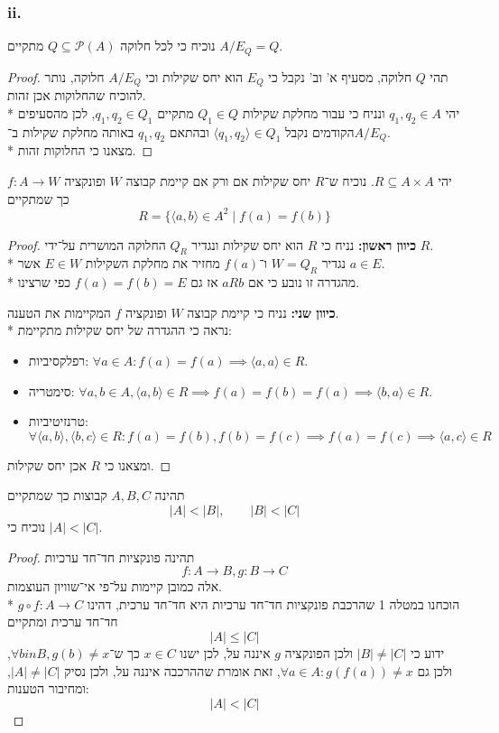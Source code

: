 \subsubsection{ii.}
נוכיח כי לכל חלוקה $Q \subseteq \mathcal{P}(A)$ מתקיים $A/E_Q = Q$.
\begin{proof}
	תהי $Q$ חלוקה, מסעיף א' וב' נקבל כי $E_Q$ הוא יחס שקילות וכי $A/E_Q$ חלוקה, נותר להוכיח שהחלוקות אכן זהות. \\*
	יהי $q_1, q_2 \in A$ ונניח כי עבור מחלקת שקילות $Q_1 \in Q$ מתקיים $q_1, q_2 \in Q_1$, לכן מהסעיפים הקודמים נקבל $\langle q_1, q_2 \rangle \in Q_1$ ובהתאם $q_1, q_2$ באותה מחלקת שקילות ב־$A/E_Q$. \\*
	מצאנו כי החלוקות זהות.
\end{proof}

\Question{}
יהי $R \subseteq A \times A$. נוכיח ש־$R$ יחס שקילות אם ורק אם קיימת קבוצה $W$ ופונקציה $f : A \to W$ כך שמתקיים
\[
	R = \{ \langle a, b \rangle \in A^2 \mid f(a) = f(b) \}
\]
\begin{proof}
	\textbf{כיוון ראשון:}
	נניח כי $R$ הוא יחס שקילות ונגדיר $Q_R$ החלוקה המושרית על־ידי $R$. \\*
	נגדיר $W = Q_R$ ו־$f(a)$ מחזיר את מחלקת השקילות $E \in W$ אשר $a \in E$. \\*
	מהגדרה זו נובע כי אם $a R b$ אז גם $f(a) = f(b) = E$ כפי שרצינו.

	\textbf{כיוון שני:}
	נניח כי קיימת קבוצה $W$ ופונקציה $f$ המקיימות את הטענה. \\*
	נראה כי ההגדרה של יחס שקילות מתקיימת:
	\begin{itemize}
		\item רפלקסיביות: $\forall a \in A : f(a) = f(a) \implies \langle a, a \rangle \in R$.
		\item סימטריה: $\forall a, b \in A, \langle a, b \rangle \in R \implies f(a) = f(b) = f(a) \implies \langle b, a \rangle \in R$.
		\item טרנזיטיביות: $\forall \langle a, b \rangle, \langle b, c \rangle \in R: f(a) = f(b), f(b) = f(c) \implies f(a) = f(c) \implies \langle a, c \rangle \in R$
	\end{itemize}
	ומצאנו כי $R$ אכן יחס שקילות.
\end{proof}

\Question{}
תהינה $A, B, C$ קבוצות כך שמתקיים
\[
	|A| < |B|, \qquad |B| < |C|
\]
נוכיח כי $|A| < |C|$.
\begin{proof}
	תהינה פונקציות חד־חד ערכיות
	\[
		f : A \to B, g : B \to C
	\]
	אלה כמובן קיימות על־פי אי־שוויון העוצמות. \\*
	הוכחנו במטלה 1 שהרכבת פונקציות חד־חד ערכיות היא חד־חד ערכית, דהינו $g \circ f : A \to C$ חד־חד ערכית ומתקיים
	\[
		|A| \le |C|
	\]
	ידוע כי $|B| \ne |C|$ ולכן הפונקציה $g$ איננה על, לכן ישנו $x \in C$ כך ש־$\forall b in B, g(b) \ne x$, ולכן גם $\forall a \in A : g(f(a)) \ne x$, זאת אומרת שההרכבה איננה על, ולכן נסיק $|A| \ne |C|$, ומחיבור הטענות:
	\[
		|A| < |C|
	\]
\end{proof}

